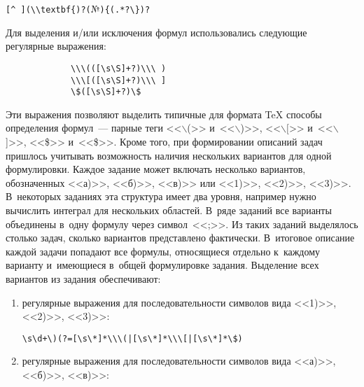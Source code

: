\begin{multicols}{2}
\begin{center}
\noindent
{\small \verb![^ ](\\textbf{)?(!{\sf №}\verb!){(.*?\})?!}
\end{center}

      
      Для выделения и/или исключения формул использовались сле\-ду\-ющие 
регулярные выражения:
{\small      \begin{verbatim}
             \\\(([\s\S]+?)\\\ )
             \\\[([\s\S]+?)\\\ ]
             \$([\s\S]+?)\$
\end{verbatim}
}

     \noindent
      Эти выражения позволяют выделить типичные для формата \TeX 
способы определения формул~--- пар\-ные теги <<$\backslash$(>> 
и~<<$\backslash$)>>, <<$\backslash[$>> и~<<$\backslash$]>>, <<\$>> 
и~<<\$>>.
      Кроме того, при формировании описаний задач пришлось учитывать 
воз\-мож\-ность наличия нескольких вариантов для одной формулировки. 
Каж\-дое задание может вклю\-чать несколько вариантов, обозначенных <<а)>>, 
<<б)>>, <<в)>> или <<1)>>, <<2)>>, <<3)>>. В~некоторых заданиях эта 
структура имеет два уровня, например нужно вы\-чис\-лить интеграл для 
нескольких областей. В~ряде заданий все варианты объединены в~одну 
формулу через символ~<<;>>. Из таких заданий выделялось столько задач, 
сколько вариантов пред\-став\-ле\-но фактически. В~итоговое описание каж\-дой 
задачи попадают все формулы, от\-но\-ся\-щи\-еся отдельно к~каж\-до\-му варианту 
и~имеющиеся в~общей формулировке задания. Выделение всех вариантов из 
задания обеспечивают:
      \begin{enumerate}[(1)]
\item регулярные выражения для по\-сле\-до\-ва\-тель\-ности символов вида <<1)>>, <<2)>>, <<3)>>:

{\small \begin{verbatim}
\s\d+\)(?=[\s\*]*\\\(|[\s\*]*\\\[|[\s\*]*\$)
       \end{verbatim}
       }
       
       \vspace*{-12pt}
       
\item регулярные выражения для по\-сле\-до\-ва\-тель\-ности символов вида <<а)>>,  <<б)>>, <<в)>>:


\end{enumerate}
\end{multicols}
